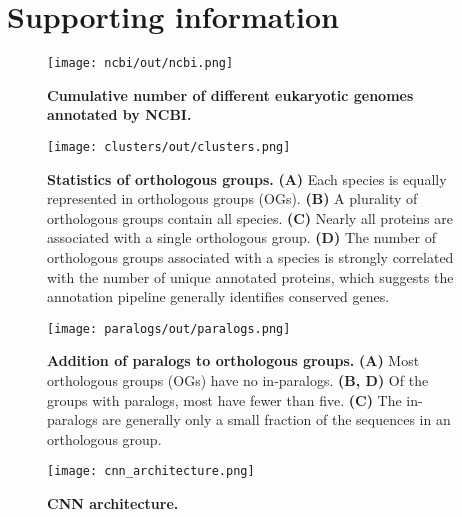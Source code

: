 \documentclass[10pt,letterpaper]{article}
\begin{document}
\printbibliography

\clearpage

\section*{Supporting information}
\setcounter{figure}{0}
\renewcommand{\thefigure}{S\arabic{figure}}

\begin{figure}[h!]
\texttt{[image: ncbi/out/ncbi.png]}
\centering
\caption{\textbf{Cumulative number of different eukaryotic genomes annotated by NCBI.}}
\label{sfig:ncbi}
\end{figure}

\begin{figure}[h!]
\texttt{[image: clusters/out/clusters.png]}
\centering
\caption{\textbf{Statistics of orthologous groups.}
\textbf{(A)} Each species is equally represented in orthologous groups (OGs). \textbf{(B)} A plurality of orthologous groups contain all species. \textbf{(C)} Nearly all proteins are associated with a single orthologous group. \textbf{(D)} The number of orthologous groups associated with a species is strongly correlated with the number of unique annotated proteins, which suggests the annotation pipeline generally identifies conserved genes.}
\label{sfig:clusters}
\end{figure}

\begin{figure}[h!]
\texttt{[image: paralogs/out/paralogs.png]}
\centering
\caption{\textbf{Addition of paralogs to orthologous groups.}
\textbf{(A)} Most orthologous groups (OGs) have no in-paralogs. \textbf{(B, D)} Of the groups with paralogs, most have fewer than five. \textbf{(C)} The in-paralogs are generally only a small fraction of the sequences in an orthologous group.}
\label{sfig:paralogs}
\end{figure}

\begin{figure}[h!]
\texttt{[image: cnn\_architecture.png]}
\centering
\caption{\textbf{CNN architecture.}}
\label{sfig:cnn_architecture}
\end{figure}
\end{document}
